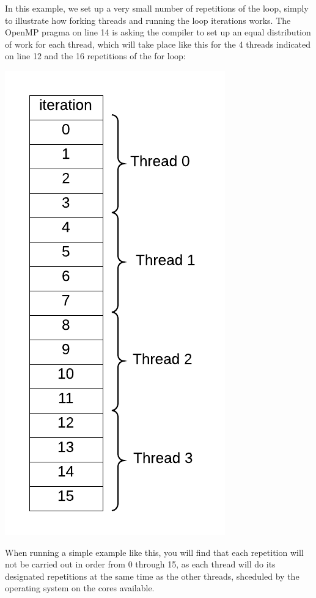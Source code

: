 \documentclass[letterpaper,10pt,openany,oneside]{sphinxmanual}
\begin{document}
In this example, we set up a very small number of repetitions of the loop, simply to illustrate how forking threads and running the loop iterations works.  The OpenMP pragma on line 14 is asking the compiler to set up an equal distribution of work for each thread, which will take place like this for the 4 threads indicated on line 12 and the 16 repetitions of the for loop:

\includegraphics{ParalleFor_Chunks-4_threads.png}

When running a simple example like this, you will find that each repetition will not be carried out in order from 0 through 15, as each thread will do its designated repetitions at the same time as the other threads, shceduled by the operating system on the cores available.
\end{document}
